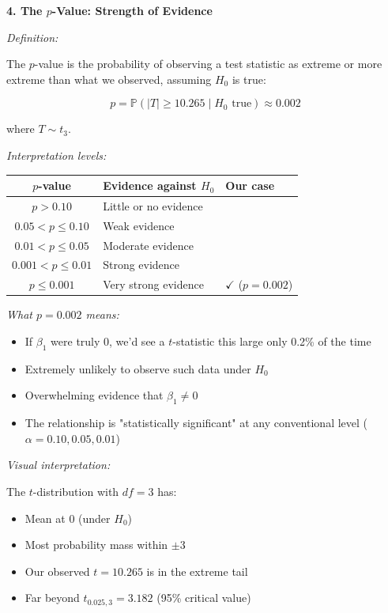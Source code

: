 \documentclass[12pt]{article}
\begin{document}
\begin{explanation}
\textbf{4. The $p$-Value: Strength of Evidence}

\textit{Definition:}

The $p$-value is the probability of observing a test statistic as extreme or more extreme than what we observed, assuming $H_0$ is true:

\[
p = \mathbb{P}(|T| \geq 10.265 \mid H_0 \text{ true}) \approx 0.002
\]

where $T \sim t_3$.

\textit{Interpretation levels:}

\begin{center}
\begin{tabular}{|c|l|l|}
\hline
\textbf{$p$-value} & \textbf{Evidence against $H_0$} & \textbf{Our case} \\
\hline
$p > 0.10$ & Little or no evidence & \\
$0.05 < p \leq 0.10$ & Weak evidence & \\
$0.01 < p \leq 0.05$ & Moderate evidence & \\
$0.001 < p \leq 0.01$ & Strong evidence & \\
$p \leq 0.001$ & Very strong evidence & $\checkmark$ ($p = 0.002$) \\
\hline
\end{tabular}
\end{center}

\textit{What $p = 0.002$ means:}

\begin{itemize}
    \item If $\beta_1$ were truly 0, we'd see a $t$-statistic this large only 0.2\% of the time
    \item Extremely unlikely to observe such data under $H_0$
    \item Overwhelming evidence that $\beta_1 \neq 0$
    \item The relationship is "statistically significant" at any conventional level ($\alpha = 0.10, 0.05, 0.01$)
\end{itemize}

\textit{Visual interpretation:}

The $t$-distribution with $df = 3$ has:
\begin{itemize}
    \item Mean at 0 (under $H_0$)
    \item Most probability mass within $\pm 3$
    \item Our observed $t = 10.265$ is in the extreme tail
    \item Far beyond $t_{0.025,3} = 3.182$ (95\% critical value)
\end{itemize}


\end{explanation}
\end{document}

